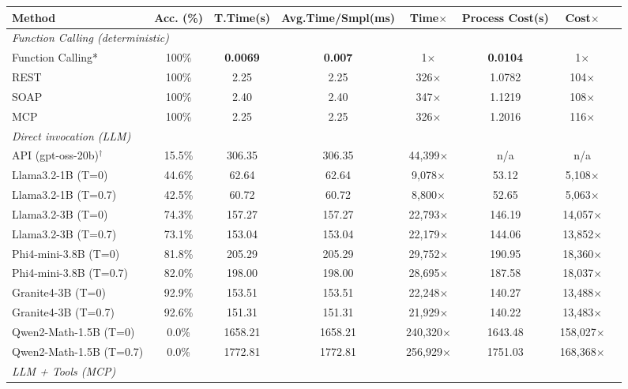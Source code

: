 \begin{table}[t]
\centering
\begin{tabular}{lccccccc}
\hline
\small
\textbf{Method}  & \textbf{Acc. (\%)} & \textbf{T.Time(s)} & \textbf{Avg.Time/Smpl(ms)} & \textbf{Time$\times$} & \textbf{Process Cost(s)} & \textbf{Cost$\times$} \\
\hline
\multicolumn{7}{l}{\textit{Function Calling (deterministic)}} \\
\hline
Function Calling* & 100\% & \textbf{0.0069} & \textbf{0.007} & 1$\times$ & \textbf{0.0104} & 1$\times$ \\
REST & 100\% & 2.25 & 2.25 & 326$\times$ & 1.0782 & 104$\times$ \\
SOAP & 100\% & 2.40 & 2.40 & 347$\times$ & 1.1219 & 108$\times$ \\
MCP & 100\% & 2.25 & 2.25 & 326$\times$ & 1.2016 & 116$\times$ \\
\hline
\multicolumn{7}{l}{\textit{Direct invocation (LLM)}} \\
\hline
API (gpt-oss-20b)$^\dagger$ & 15.5\% & 306.35 & 306.35 & 44{,}399$\times$ & n/a & n/a \\
Llama3.2-1B (T=0) & 44.6\% & 62.64 & 62.64 & 9{,}078$\times$ & 53.12 & 5{,}108$\times$ \\
Llama3.2-1B (T=0.7) & 42.5\% & 60.72 & 60.72 & 8{,}800$\times$ & 52.65 & 5{,}063$\times$ \\
Llama3.2-3B (T=0) & 74.3\% & 157.27 & 157.27 & 22{,}793$\times$ & 146.19 & 14{,}057$\times$ \\
Llama3.2-3B (T=0.7) & 73.1\% & 153.04 & 153.04 & 22{,}179$\times$ & 144.06 & 13{,}852$\times$ \\
Phi4-mini-3.8B (T=0) & 81.8\% & 205.29 & 205.29 & 29{,}752$\times$ & 190.95 & 18{,}360$\times$ \\
Phi4-mini-3.8B (T=0.7) & 82.0\% & 198.00 & 198.00 & 28{,}695$\times$ & 187.58 & 18{,}037$\times$ \\
Granite4-3B (T=0) & 92.9\% & 153.51 & 153.51 & 22{,}248$\times$ & 140.27 & 13{,}488$\times$ \\
Granite4-3B (T=0.7) & 92.6\% & 151.31 & 151.31 & 21{,}929$\times$ & 140.22 & 13{,}483$\times$ \\
Qwen2-Math-1.5B (T=0) & 0.0\% & 1658.21 & 1658.21 & 240{,}320$\times$ & 1643.48 & 158{,}027$\times$ \\
Qwen2-Math-1.5B (T=0.7) & 0.0\% & 1772.81 & 1772.81 & 256{,}929$\times$ & 1751.03 & 168{,}368$\times$ \\
\hline
\multicolumn{7}{l}{\textit{LLM + Tools (MCP)}} \\

\end{tabular}
\end{table}
